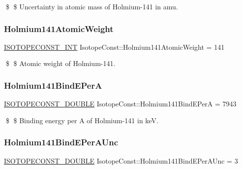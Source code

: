\$ \$ Uncertainty in atomic mass of Holmium-\/141 in amu. \mbox{\label{group___isotope_const-_holmium-_ho141_ga04cea861d831c8912c516859a95362c0}} 
\subsubsection{\texorpdfstring{Holmium141\+Atomic\+Weight}{Holmium141AtomicWeight}}
{\footnotesize\ttfamily \mbox{\hyperlink{group___isotope_const-_macros_ga5f18360b3e99483a35c32d789e62621c}{I\+S\+O\+T\+O\+P\+E\+C\+O\+N\+S\+T\+\_\+\+I\+NT}} Isotope\+Const\+::\+Holmium141\+Atomic\+Weight = 141}

\$ \$ Atomic weight of Holmium-\/141. \mbox{\label{group___isotope_const-_holmium-_ho141_ga828553b60c824009da9082e1018e50b3}} 
\subsubsection{\texorpdfstring{Holmium141\+Bind\+E\+PerA}{Holmium141BindEPerA}}
{\footnotesize\ttfamily \mbox{\hyperlink{group___isotope_const-_macros_ga8f45a7272ce02c0b4c65c44636ed719a}{I\+S\+O\+T\+O\+P\+E\+C\+O\+N\+S\+T\+\_\+\+D\+O\+U\+B\+LE}} Isotope\+Const\+::\+Holmium141\+Bind\+E\+PerA = 7943}

\$ \$ Binding energy per A of Holmium-\/141 in keV. \mbox{\label{group___isotope_const-_holmium-_ho141_gab9c8a571ed4c064a986c47e0ffaf8515}} 
\subsubsection{\texorpdfstring{Holmium141\+Bind\+E\+Per\+A\+Unc}{Holmium141BindEPerAUnc}}
{\footnotesize\ttfamily \mbox{\hyperlink{group___isotope_const-_macros_ga8f45a7272ce02c0b4c65c44636ed719a}{I\+S\+O\+T\+O\+P\+E\+C\+O\+N\+S\+T\+\_\+\+D\+O\+U\+B\+LE}} Isotope\+Const\+::\+Holmium141\+Bind\+E\+Per\+A\+Unc = 3}

